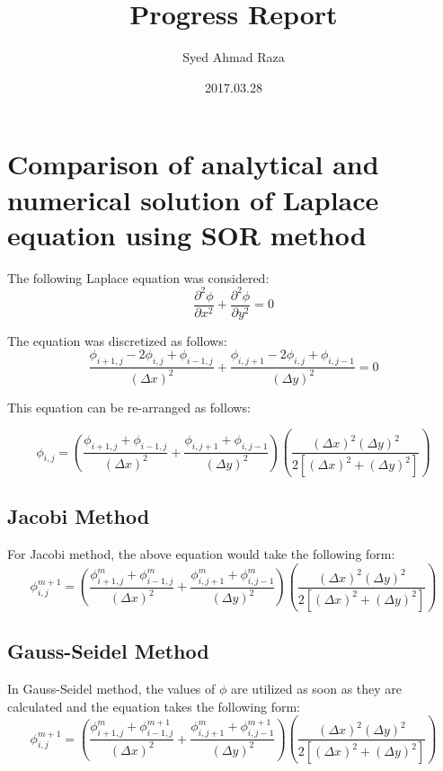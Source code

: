 \documentclass[12pt,a4paper,fleqn]{article}
\title{Progress Report}
\author{Syed Ahmad Raza}
\date{2017.03.28}
\begin{document}
\maketitle
\section*{Comparison of analytical and numerical solution of Laplace
equation using SOR method}

The following Laplace equation was considered:
\begin{equation}
\frac{\partial^2\phi}{\partial x^2} + \frac{\partial^2\phi}{\partial y^2} = 0
\end{equation}

The equation was discretized as follows:
\begin{equation}
\frac{\phi_{i+1,j}-2\phi_{i,j}+\phi_{i-1,j}}{(\Delta x)^2} +
\frac{\phi_{i,j+1}-2\phi_{i,j}+\phi_{i,j-1}}{(\Delta y)^2} = 0
\end{equation}

This equation can be re-arranged as follows:

\begin{equation}
\phi_{i,j} = \left(
\frac{\phi_{i+1,j}+\phi_{i-1,j}}{(\Delta x)^2} +
\frac{\phi_{i,j+1}+\phi_{i,j-1}}{(\Delta y)^2}
\right)\left(\frac{(\Delta x)^2(\Delta y)^2}{2[(\Delta x)^2+(\Delta y)^2]}\right)
\end{equation}

\subsection*{Jacobi Method}
For Jacobi method, the above equation would take the following form:
\begin{equation}
\phi^{m+1}_{i,j} =
\left(
\frac{\phi^m_{i+1,j}+\phi^{m}_{i-1,j}}{(\Delta x)^2} +
\frac{\phi^m_{i,j+1}+\phi^{m}_{i,j-1}}{(\Delta y)^2}
\right)\left(\frac{(\Delta x)^2(\Delta y)^2}{2[(\Delta x)^2+(\Delta y)^2]}
\right)
\end{equation}

\subsection*{Gauss-Seidel Method}
In Gauss-Seidel method, the values of $\phi$ are utilized as soon as they
are calculated and the equation takes the following form:
\begin{equation}
\phi^{m+1}_{i,j} =
\left(
\frac{\phi^m_{i+1,j}+\phi^{m+1}_{i-1,j}}{(\Delta x)^2} +
\frac{\phi^m_{i,j+1}+\phi^{m+1}_{i,j-1}}{(\Delta y)^2}
\right)\left(\frac{(\Delta x)^2(\Delta y)^2}{2[(\Delta x)^2+(\Delta y)^2]}
\right)
\end{equation}
\end{document}
